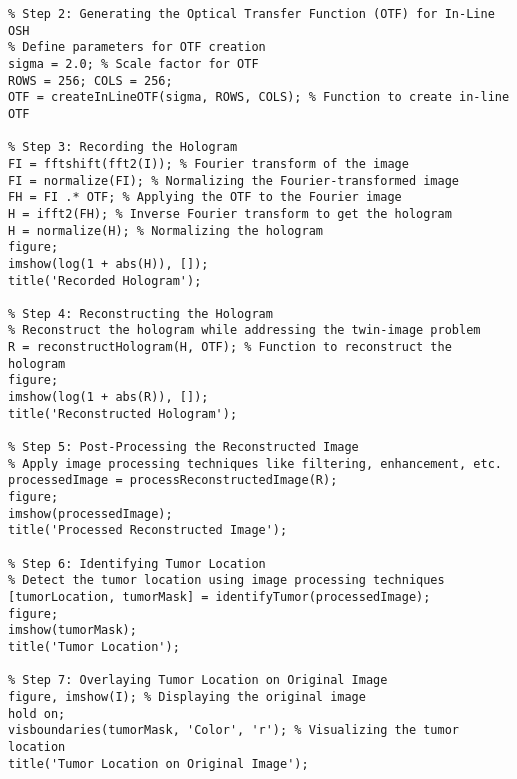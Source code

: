 \begin{appendices}
\begin{lstlisting}
% Step 2: Generating the Optical Transfer Function (OTF) for In-Line OSH
% Define parameters for OTF creation
sigma = 2.0; % Scale factor for OTF
ROWS = 256; COLS = 256;
OTF = createInLineOTF(sigma, ROWS, COLS); % Function to create in-line OTF

% Step 3: Recording the Hologram
FI = fftshift(fft2(I)); % Fourier transform of the image
FI = normalize(FI); % Normalizing the Fourier-transformed image
FH = FI .* OTF; % Applying the OTF to the Fourier image
H = ifft2(FH); % Inverse Fourier transform to get the hologram
H = normalize(H); % Normalizing the hologram
figure;
imshow(log(1 + abs(H)), []);
title('Recorded Hologram');

% Step 4: Reconstructing the Hologram
% Reconstruct the hologram while addressing the twin-image problem
R = reconstructHologram(H, OTF); % Function to reconstruct the hologram
figure;
imshow(log(1 + abs(R)), []);
title('Reconstructed Hologram');

% Step 5: Post-Processing the Reconstructed Image
% Apply image processing techniques like filtering, enhancement, etc.
processedImage = processReconstructedImage(R);
figure;
imshow(processedImage);
title('Processed Reconstructed Image');

% Step 6: Identifying Tumor Location
% Detect the tumor location using image processing techniques
[tumorLocation, tumorMask] = identifyTumor(processedImage);
figure;
imshow(tumorMask);
title('Tumor Location');

% Step 7: Overlaying Tumor Location on Original Image
figure, imshow(I); % Displaying the original image
hold on;
visboundaries(tumorMask, 'Color', 'r'); % Visualizing the tumor location
title('Tumor Location on Original Image');
\end{lstlisting}

\end{appendices}
